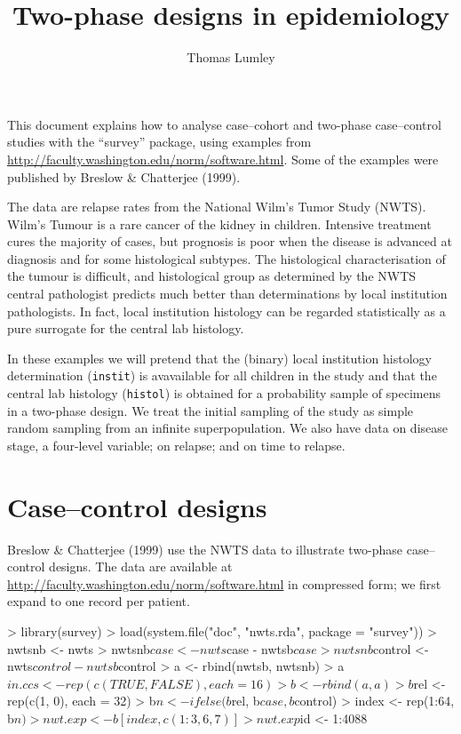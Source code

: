 \documentclass{article}
\author{Thomas Lumley}
\title{Two-phase designs in epidemiology}
\begin{document}
\maketitle
This document explains how to analyse case--cohort and two-phase
case--control studies with the ``survey'' package, using examples from
\url{http://faculty.washington.edu/norm/software.html}. Some of the
examples were published by  Breslow \& Chatterjee (1999).

The data are relapse rates from the National Wilm's Tumor
Study (NWTS). Wilm's Tumour is a rare cancer of the kidney in
children. Intensive treatment cures the majority of cases, but
prognosis is poor when the disease is advanced at diagnosis and for
some histological subtypes.  The histological characterisation of the
tumour is difficult, and histological group as determined by the NWTS
central pathologist predicts much better than determinations by local
institution pathologists. In fact, local institution histology can be
regarded statistically as a pure surrogate for the central lab
histology.

In these examples we will pretend that the (binary) local institution
histology determination (\texttt{instit}) is avavailable for all
children in the study and that the central lab histology
(\texttt{histol}) is obtained for a probability sample of specimens in
a two-phase design. We treat the initial sampling of the study as
simple random sampling from an infinite superpopulation.  We also have
data on disease stage, a four-level variable; on relapse; and on time
to relapse.

\section*{Case--control designs}

Breslow \& Chatterjee (1999) use the NWTS data to illustrate two-phase
case--control designs. The data are available at
\url{http://faculty.washington.edu/norm/software.html} in compressed
form; we first expand to one record per patient.
\begin{Schunk}
\begin{Sinput}
> library(survey)
> load(system.file("doc", "nwts.rda", package = "survey"))
> nwtsnb <- nwts
> nwtsnb$case <- nwts$case - nwtsb$case
> nwtsnb$control <- nwts$control - nwtsb$control
> a <- rbind(nwtsb, nwtsnb)
> a$in.ccs <- rep(c(TRUE, FALSE), each = 16)
> b <- rbind(a, a)
> b$rel <- rep(c(1, 0), each = 32)
> b$n <- ifelse(b$rel, b$case, b$control)
> index <- rep(1:64, b$n)
> nwt.exp <- b[index, c(1:3, 6, 7)]
> nwt.exp$id <- 1:4088
\end{Sinput}
\end{Schunk}
\end{document}
